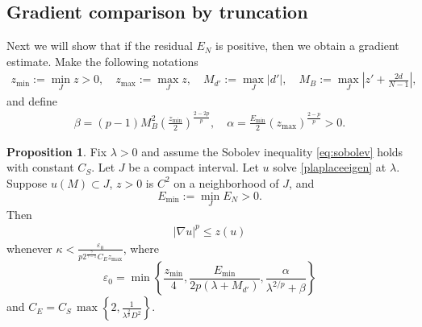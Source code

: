 \documentclass[11pt]{amsart}
\def \eps {\varepsilon}
\theoremstyle{definition}
\newtheorem{proposition}[theorem]{Proposition}
\begin{document}
\subsection{Gradient comparison by truncation}
Next we will show that if the residual $E_N$ is positive, then we obtain a gradient estimate.  Make the following notations
    \begin{align*}
        z_{\min}:=\min_J z>0, \quad z_{\max}:= \max_J z, \quad M_{d'}:=\max_J|d'|,\quad M_B:=\max_J\left|z'+\frac{2d}{N-1}\right|,
    \end{align*}
    and define
    \begin{align*}
        \beta=(p-1)M_B^2\left(\frac{z_{\min}}{2}\right)^{\frac{2-2p}{p}}, \quad \alpha = \frac{E_{\min}}{2}(z_{\max})^{\frac{2-p}{p}}>0.
    \end{align*}
\begin{proposition}\label{gradestprof}
    Fix $\lambda>0$ and assume the Sobolev inequality \eqref{eq:sobolev} holds with constant $C_S$.  Let $J$ be a compact interval.  Let $u$ solve \eqref{plaplaceeigen} at $\lambda$.  Suppose $u(M)\subset J$, $z>0$ is $C^2$ on a neighborhood of $J$, and 
    \begin{equation*}
        E_{\min}:=\min_J E_N>0.
        \end{equation*}
        Then
    \begin{align*}
        |\nabla u|^p \leq z(u)
    \end{align*}
    whenever $\kappa < \frac{\eps_0}{p2^{\frac{\gamma}{\gamma-1}}C_Ez_{\max}}$, where
    \begin{equation*}
    \eps_0 = \min\left\{ \frac{z_{\min}}{4},\frac{E_{\min}}{2p(\lambda+M_{d'})}, \frac{\alpha}{\lambda^{2/p}+\beta}\right\}
\end{equation*}
and $C_E=C_S\,\max\left\{2,\frac{1}{\lambda^{\frac{2}{p}}D^2}\right\}$.
\end{proposition}
\end{document}
